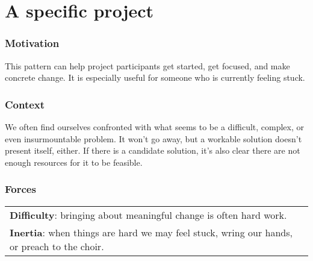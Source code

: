 \section{A specific project}\label{sec:A specific project}
\subsubsection*{Motivation} This pattern can help project participants get started, get focused, and make concrete change.  It is especially useful for someone who is currently feeling stuck.



\subsubsection*{Context}
We often find ourselves confronted with what seems to be a difficult, complex, or even insurmountable problem.  It won't go away, but a workable solution doesn't present itself, either.  If there is a candidate solution, it's also clear there are not enough resources for it to be feasible.

\subsubsection*{Forces}
\raisebox{-1\baselineskip}
{{\centering
\begin{tabular}{p{}}
\textbf{Difficulty}: bringing about meaningful change is often hard work.\\
\textbf{Inertia}: when things are hard we may feel stuck, wring our hands, or preach to the choir.
\end{tabular}
}}

